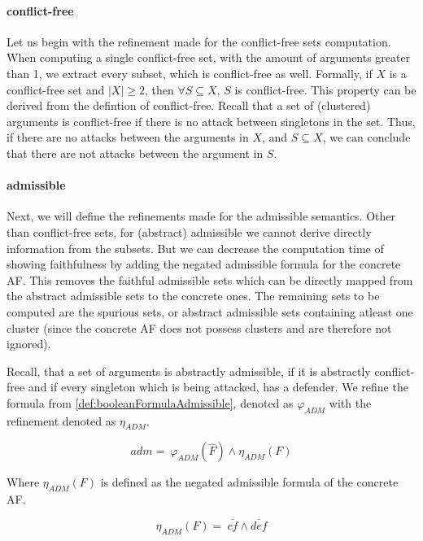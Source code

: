 \paragraph{conflict-free} Let us begin with the refinement made for the conflict-free sets computation. When computing a single conflict-free set, with the amount of arguments greater than 1, we extract every subset, which is conflict-free as well. Formally, if $X$ is a conflict-free set and $|X|\geq 2$, then $\forall S \subseteq X$, $S$ is conflict-free. This property can be derived from the defintion of conflict-free. Recall that a set of (clustered) arguments is conflict-free if there is no attack between singletons in the set. Thus, if there are no attacks between the arguments in $X$, and $S \subseteq X$, we can conclude that there are not attacks between the argument in $S$.

\paragraph{admissible} Next, we will define the refinements made for the admissible semantics. Other than conflict-free sets, for (abstract) admissible we cannot derive directly information from the subsets. But we can decrease the computation time of showing faithfulness by adding the negated admissible formula for the concrete AF. This removes the faithful admissible sets which can be directly mapped from the abstract admissible sets to the concrete ones. The remaining sets to be computed are the spurious sets, or abstract admissible sets containing atleast one cluster (since the concrete AF does not possess clusters and are therefore not ignored).

Recall, that a set of arguments is abstractly admissible, if it is abstractly conflict-free and if every singleton which is being attacked, has a defender. We refine the formula from \cref{def:booleanFormulaAdmissible}, denoted as $\varphi_{\!A\!D\!M}$ with the refinement denoted as $\eta_{\!A\!D\!M}$.

\vspace{0.2cm}
$$
    \hat{adm}=\ \varphi_{\!A\!D\!M}(\hat{F}) \land \eta_{\!A\!D\!M}(F)
$$
\vspace{0.1cm}

Where $\eta_{\!A\!D\!M}(F)$ is defined as the negated admissible formula of the concrete AF.

\vspace{0.2cm}

$$
    \eta_{\!A\!D\!M}(F)=\ \overline{cf} \land \overline{def}
$$

